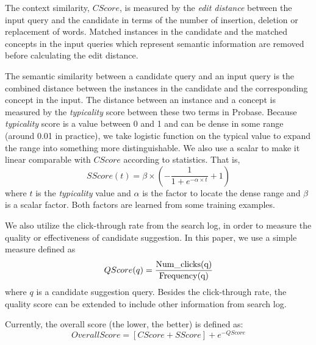 The context similarity, $CScore$, is measured by the \textit{edit distance} between
the input query and the candidate in terms of
the number of insertion, deletion or replacement of words. Matched instances in
the candidate and the matched concepts in the input queries which
represent semantic information are removed before
calculating the edit distance.

The semantic similarity between a candidate query and an input query is the
combined distance between the instances in the candidate and the corresponding
concept in the input. The distance between an instance and a concept is
measured by the \textit{typicality} score between these two terms in
Probase. Because \textit{typicality} score is a value between 0 and 1 and can be
dense in some range (around 0.01 in practice), we take
logistic function on the typical value to expand the range into something
more distinguishable. We also use a scalar to make it linear  comparable with
$CScore$ according to statistics. That is,
\[SScore(t)=\beta \times (-\frac {1} {1+e^{-\alpha \times t}} + 1) \]
where $t$ is the \textit{typicality} value and $\alpha$ is the factor to
locate the dense range and $\beta$ is a scalar factor. Both factors are
learned from some training examples.


We also utilize the click-through rate from the search log,
in order to measure the quality or effectiveness of candidate suggestion.
In this paper, we use a simple measure defined as
\[QScore(q)=\frac {\rm{Num\_clicks}(q)} {\rm{Frequency}(q)}\] 
where $q$ is a candidate suggestion query.
Besides the click-through rate, the quality score can be extended to
include other information from search log.

Currently, the overall score (the lower, the better) is defined as:
\[OverallScore = [CScore + SScore] + e^{-QScore} \]

